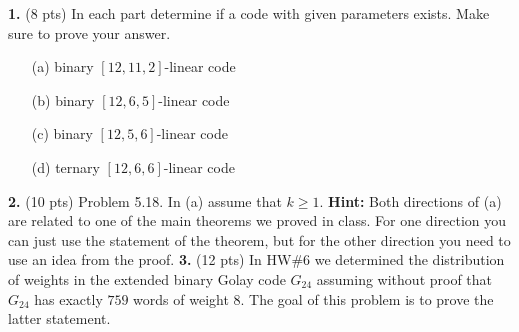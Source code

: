 \documentclass[12pt]{amsart}
\begin{document}
\skv
{\bf 1.} (8 pts) In each part determine if a code with given parameters exists. Make sure to prove your answer.
\begin{itemize}
\item[(a)] binary $[12,11,2]$-linear code
\item[(b)] binary $[12,6,5]$-linear code
\item[(c)] binary $[12,5,6]$-linear code
\item[(d)] ternary $[12,6,6]$-linear code
\end{itemize}
{\bf 2.} (10 pts) Problem 5.18. In (a) assume that $k\geq 1$. {\bf Hint:} Both directions of (a) are related to one of the main theorems we proved in class. For one direction you can just use the statement of the theorem, but for the other direction you need to use an idea from the proof. 
\skv
{\bf 3.} (12 pts) In HW\#6 we determined the distribution of weights in the extended binary Golay code $G_{24}$ assuming without proof that $G_{24}$
has exactly $759$ words of weight $8$. The goal of this problem is to prove the latter statement.
\end{document}
